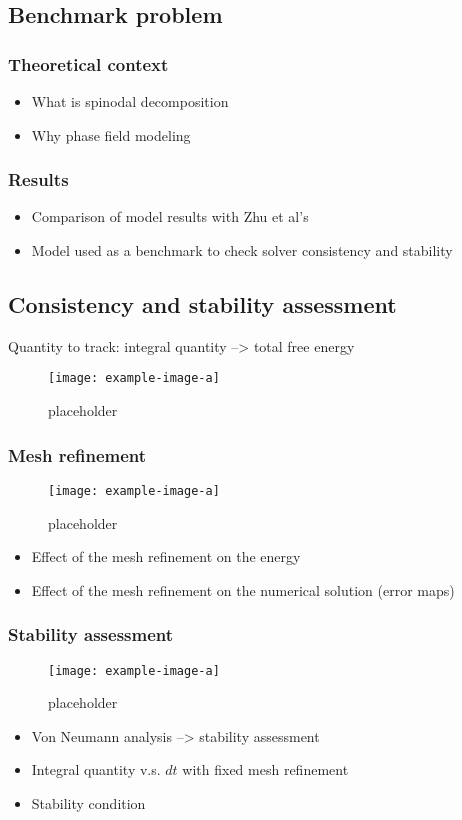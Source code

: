 \subsection{Benchmark problem}
    \subsubsection{Theoretical context}
    \begin{itemize}
        \item What is spinodal decomposition
        \item Why phase field modeling
    \end{itemize}
    \subsubsection{Results}
    \begin{itemize}
        \item Comparison of model results with Zhu et al's
        \item Model used as a benchmark to check solver consistency and stability
    \end{itemize}
\subsection{Consistency and stability assessment}
    Quantity to track: integral quantity --> total free energy
    \begin{figure}[H]
        \centering
        \texttt{[image: example-image-a]}
        \caption{placeholder}
        \label{fig:ftot}
    \end{figure}
    \subsubsection{Mesh refinement}
    \begin{figure}[H]
        \centering
        \texttt{[image: example-image-a]}
        \caption{placeholder}
        \label{fig:ftot_dx}
    \end{figure}
    \begin{itemize}
        \item Effect of the mesh refinement on the energy
        \item Effect of the mesh refinement on the numerical solution (error maps)
    \end{itemize}
    \subsubsection{Stability assessment}
    \begin{figure}[H]
        \centering
        \texttt{[image: example-image-a]}
        \caption{placeholder}
        \label{fig:ftot_dt}
    \end{figure}
    \begin{itemize}
        \item Von Neumann analysis --> stability assessment
        \item Integral quantity v.s. $dt$ with fixed mesh refinement
        \item Stability condition
    \end{itemize}
